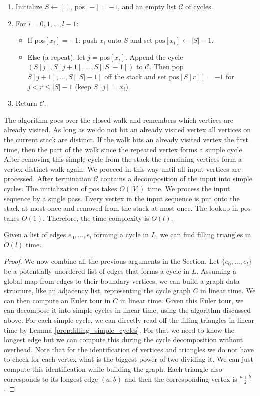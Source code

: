 %
\begin{enumerate}
\item Initialize $S\gets[\,]$, $\text{pos}[-]=-1$, and an empty list $\mathcal{C}$ of cycles.
\item For $i=0,1,\dots,l-1$:
  \begin{itemize}
  \item If $\text{pos}[x_i]=-1$: push $x_i$ onto $S$ and set $\text{pos}[x_i]\gets |S|-1$.
  \item Else (a repeat): let $j=\text{pos}[x_i]$. Append the cycle $(S[j], S[j{+}1], \dots, S[|S|-1])$ to $\mathcal{C}$. Then pop $S[j+1],\dots,S[|S|-1]$ off the stack and set $\text{pos}[S[r]]=-1$ for $j< r\leq\vert S\vert-1$ (keep $S[j]=x_i$).
  \end{itemize}
\item Return $\mathcal{C}$.
\end{enumerate}
%
The algorithm goes over the closed walk and remembers which vertices are already visited. As long as we do not hit an already visited vertex all vertices on the current stack are distinct. If the walk hits an already visited vertex the first time, then the part of the walk since the repeated vertex forms a simple cycle. After removing this simple cycle from the stack the remaining vertices form a vertex distinct walk again. We proceed in this way until all input vertices are processed. After termination $\mathcal{C}$ contains a decomposition of the input into simple cycles. The initialization of $\text{pos}$ takes $O(\vert V\vert)$ time. We process the input sequence by a single pass. Every vertex in the input sequence is put onto the stack at most once and removed from the stack at most once. The lookup in $\text{pos}$ takes $O(1)$. Therefore, the time complexity is $O(l)$.   
%
\begin{lemma} \label{prop:cycle_finding}
Given a list of edges $e_0,\ldots,e_l$ forming a cycle in $L$, we can find filling triangles in $O(l)$ time.
\end{lemma}
%
\begin{proof}
We now combine all the previous arguments in the Section. Let $\{e_0,\ldots,e_l\}$ be a potentially unordered list of edges that forms a cycle in $L$. Assuming a global map from edges to their boundary vertices, we can build a graph data structure, like an adjacency list, representing the cycle graph $C$ in linear time. We can then compute an Euler tour in $C$ in linear time. Given this Euler tour, we can decompose it into simple cycles in linear time, using the algorithm discussed above. For each simple cycle, we can directly read off the filling triangles in linear time by Lemma \ref{prop:filling_simple_cycles}. For that we need to know the longest edge but we can compute this during the cycle decomposition without overhead. Note that for the identification of vertices and triangles we do not have to check for each vertex what is the biggest power of two dividing it. We can just compute this identification while building the graph. Each triangle also corresponds to its longest edge $(a,b)$ and then the corresponding vertex is $\frac{a+b}{2}$. 
\end{proof}
%
%
%
